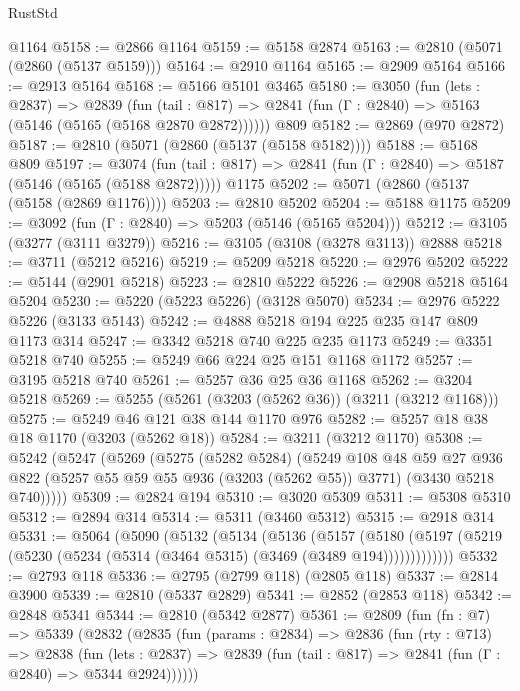 \begin{lexlean}{RustStd}
\begin{coremodule}
    @1164
@5158 := @2866 @1164
@5159 := @5158 @2874
@5163 := @2810 (@5071 (@2860 (@5137 @5159)))
@5164 := @2910 @1164
@5165 := @2909 @5164
@5166 := @2913 @5164
@5168 := @5166 @5101 @3465
@5180 := @3050
    (fun (lets : @2837) =>
    @2839
      (fun (tail : @817) => @2841 (fun (Γ : @2840) => @5163 (@5146 (@5165 (@5168 @2870 @2872))))))
    @809
@5182 := @2869 (@970 @2872)
@5187 := @2810 (@5071 (@2860 (@5137 (@5158 @5182))))
@5188 := @5168 @809
@5197 := @3074
    (fun (tail : @817) => @2841 (fun (Γ : @2840) => @5187 (@5146 (@5165 (@5188 @2872)))))
    @1175
@5202 := @5071 (@2860 (@5137 (@5158 (@2869 @1176))))
@5203 := @2810 @5202
@5204 := @5188 @1175
@5209 := @3092 (fun (Γ : @2840) => @5203 (@5146 (@5165 @5204)))
@5212 := @3105 (@3277 (@3111 @3279))
@5216 := @3105 (@3108 (@3278 @3113)) @2888
@5218 := @3711 (@5212 @5216)
@5219 := @5209 @5218
@5220 := @2976 @5202
@5222 := @5144 (@2901 @5218)
@5223 := @2810 @5222
@5226 := @2908 @5218 @5164 @5204
@5230 := @5220 (@5223 @5226) (@3128 @5070)
@5234 := @2976 @5222 @5226 (@3133 @5143)
@5242 := @4888 @5218 @194 @225 @235 @147 @809 @1173 @314
@5247 := @3342 @5218 @740 @225 @235 @1173
@5249 := @3351 @5218 @740
@5255 := @5249 @66 @224 @25 @151 @1168 @1172
@5257 := @3195 @5218 @740
@5261 := @5257 @36 @25 @36 @1168
@5262 := @3204 @5218
@5269 := @5255 (@5261 (@3203 (@5262 @36)) (@3211 (@3212 @1168)))
@5275 := @5249 @46 @121 @38 @144 @1170 @976
@5282 := @5257 @18 @38 @18 @1170 (@3203 (@5262 @18))
@5284 := @3211 (@3212 @1170)
@5308 := @5242
    (@5247
      (@5269
        (@5275
          (@5282 @5284)
          (@5249
            @108
            @48
            @59
            @27
            @936
            @822
            (@5257 @55 @59 @55 @936 (@3203 (@5262 @55)) @3771)
            (@3430 @5218 @740)))))
@5309 := @2824 @194
@5310 := @3020 @5309
@5311 := @5308 @5310
@5312 := @2894 @314
@5314 := @5311 (@3460 @5312)
@5315 := @2918 @314
@5331 := @5064
    (@5090
      (@5132
        (@5134
          (@5136
            (@5157
              (@5180
                (@5197 (@5219 (@5230 (@5234 (@5314 (@3464 @5315) (@3469 (@3489 @194)))))))))))))
@5332 := @2793 @118
@5336 := @2795 (@2799 @118) (@2805 @118)
@5337 := @2814 @3900
@5339 := @2810 (@5337 @2829)
@5341 := @2852 (@2853 @118)
@5342 := @2848 @5341
@5344 := @2810 (@5342 @2877)
@5361 := @2809
    (fun (fn : @7) =>
    @5339
      (@2832
        (@2835
          (fun (params : @2834) =>
          @2836
            (fun (rty : @713) =>
            @2838
              (fun (lets : @2837) =>
              @2839 (fun (tail : @817) => @2841 (fun (Γ : @2840) => @5344 @2924))))))

\end{coremodule}
\end{lexlean}
